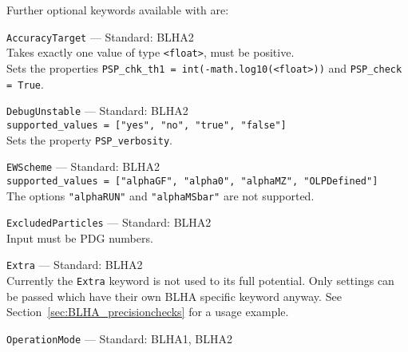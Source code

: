 Further optional keywords available with \gosam are:
\begin{basedescript}{\desclabelstyle{\pushlabel}}
    \item[\hspace{-1em}]\colorbox{gray!30}{\lstinline[style=in]|AccuracyTarget|} --- Standard: BLHA2\vspace{0.1cm}\\
        Takes exactly one value of type \texttt{<float>}, must be positive.\\
        Sets the properties \lstinline[style=in]|PSP_chk_th1 = int(-math.log10(<float>))| and  \lstinline[style=in]|PSP_check = True|.
    \item[\hspace{-1em}]\colorbox{gray!30}{\lstinline[style=in]|DebugUnstable|} --- Standard: BLHA2\vspace{0.1cm}\\
        \lstinline[style=in]|supported_values = ["yes", "no", "true", "false"]|\\
        Sets the property \texttt{PSP\_verbosity}.
    \item[\hspace{-1em}]\colorbox{gray!30}{\lstinline[style=in]|EWScheme|} --- Standard: BLHA2\vspace{0.1cm}\\
        \lstinline[style=in]|supported_values = ["alphaGF", "alpha0", "alphaMZ", "OLPDefined"]|\\
        The options \texttt{"alphaRUN"} and \texttt{"alphaMSbar"} are not supported.
    \item[\hspace{-1em}]\colorbox{gray!30}{\lstinline[style=in]|ExcludedParticles|} --- Standard: BLHA2\vspace{0.1cm}\\
        Input must be PDG numbers.
    \item[\hspace{-1em}]\colorbox{gray!30}{\lstinline[style=in]|Extra|} --- Standard: BLHA2\vspace{0.1cm}\\
        Currently the \texttt{Extra} keyword is not used to its full potential. Only settings can be passed which have their own BLHA specific keyword anyway. See Section~\ref{sec:BLHA_precisionchecks} for a usage example.
    \item[\hspace{-1em}]\colorbox{gray!30}{\lstinline[style=in]|OperationMode|} --- Standard: BLHA1, BLHA2\vspace{0.1cm}\\

\end{basedescript}
